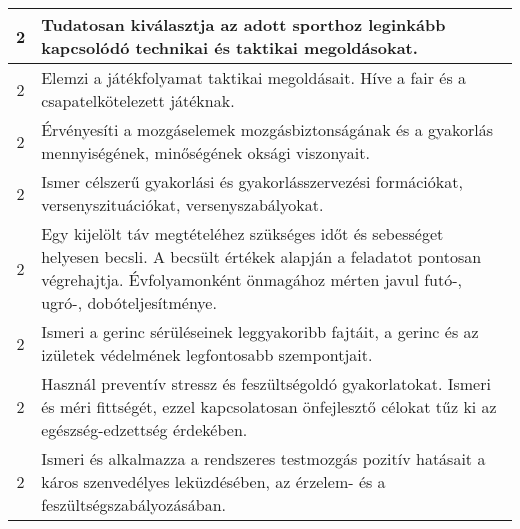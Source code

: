 \begin{longtable}{c | p{12cm} }
                                
                                          2 &  Tudatosan kiválasztja az adott sporthoz leginkább kapcsolódó technikai és taktikai megoldásokat. \\ \hline
                                          2 &  Elemzi a játékfolyamat taktikai megoldásait. Híve a fair és a csapatelkötelezett játéknak. \\ \hline
                                          2 &  Érvényesíti a mozgáselemek mozgásbiztonságának és a gyakorlás mennyiségének, minőségének oksági viszonyait. \\ \hline
                                          2 &  Ismer célszerű gyakorlási és gyakorlásszervezési formációkat, versenyszituációkat, versenyszabályokat. \\ \hline
                                          2 &  Egy kijelölt táv megtételéhez szükséges időt és sebességet helyesen becsli. A becsült értékek alapján a feladatot pontosan végrehajtja. Évfolyamonként önmagához mérten javul futó-, ugró-, dobóteljesítménye. \\ \hline
                                          2 &  Ismeri a gerinc sérüléseinek leggyakoribb fajtáit, a gerinc és az izületek védelmének legfontosabb szempontjait. \\ \hline
                                          2 &  Használ preventív stressz és feszültségoldó gyakorlatokat. Ismeri és méri fittségét, ezzel kapcsolatosan önfejlesztő célokat tűz ki az egészség-edzettség érdekében. \\ \hline
                                          2 &  Ismeri és alkalmazza a rendszeres testmozgás pozitív hatásait a káros szenvedélyes leküzdésében, az érzelem- és a feszültségszabályozásában. \\ \hline
                                      

\end{longtable}
